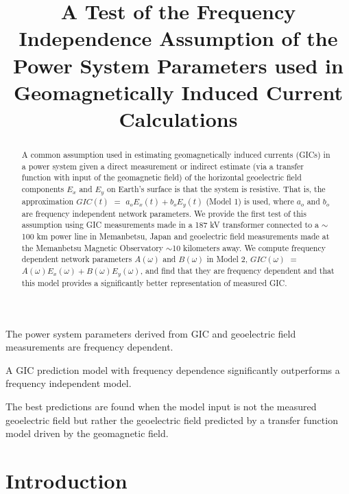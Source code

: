 \documentclass[draft,linenumbers]{agujournal2018}
\begin{document}
\title{A Test of the Frequency Independence Assumption of the Power System Parameters used in Geomagnetically Induced Current Calculations}





\begin{keypoints}
\item The power system parameters derived from GIC and geoelectric field measurements are frequency dependent.
\item A GIC prediction model with frequency dependence significantly outperforms a frequency independent model.
\item The best predictions are found when the model input is not the measured geoelectric field but rather the geoelectric field predicted by a transfer function model driven by the geomagnetic field.
\end{keypoints}

\begin{abstract}
A common assumption used in estimating geomagnetically induced currents (GICs) in a power system given a direct measurement or indirect estimate (via a transfer function with input of the geomagnetic field) of the horizontal geoelectric field components $E_x$ and $E_y$ on Earth's surface is that the system is resistive. That is, the approximation $GIC(t)$  $=$ $a_oE_x(t) + b_oE_y(t)$ (Model 1) is used, where $a_o$ and $b_o$ are frequency independent network parameters.  We provide the first test of this assumption using GIC measurements made in a 187 kV transformer connected to a $\sim$100 km power line in Memanbetsu, Japan and geoelectric field measurements made at the Memanbetsu Magnetic Observatory $\sim$10 kilometers away.  We compute frequency dependent network parameters  $A(\omega)$ and $B(\omega)$ in Model 2, $GIC(\omega)$ $=$ $A(\omega)E_x(\omega) + B(\omega)E_y(\omega)$, and find that they are frequency dependent and that this model provides a significantly better representation of measured GIC.
\end{abstract}

\section{Introduction}
\end{document}
